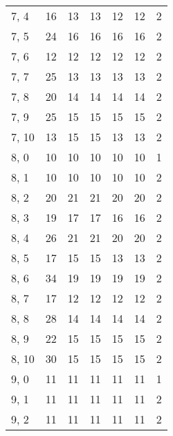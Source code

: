 \begin{table}
\begin{tabular}{lrrrrrr}
7, 4   &          16 &           13 &         13 &           12 &        12 &      2 \\
7, 5   &          24 &           16 &         16 &           16 &        16 &      2 \\
7, 6   &          12 &           12 &         12 &           12 &        12 &      2 \\
7, 7   &          25 &           13 &         13 &           13 &        13 &      2 \\
7, 8   &          20 &           14 &         14 &           14 &        14 &      2 \\
7, 9   &          25 &           15 &         15 &           15 &        15 &      2 \\
7, 10  &          13 &           15 &         15 &           13 &        13 &      2 \\
8, 0   &          10 &           10 &         10 &           10 &        10 &      1 \\
8, 1   &          10 &           10 &         10 &           10 &        10 &      2 \\
8, 2   &          20 &           21 &         21 &           20 &        20 &      2 \\
8, 3   &          19 &           17 &         17 &           16 &        16 &      2 \\
8, 4   &          26 &           21 &         21 &           20 &        20 &      2 \\
8, 5   &          17 &           15 &         15 &           13 &        13 &      2 \\
8, 6   &          34 &           19 &         19 &           19 &        19 &      2 \\
8, 7   &          17 &           12 &         12 &           12 &        12 &      2 \\
8, 8   &          28 &           14 &         14 &           14 &        14 &      2 \\
8, 9   &          22 &           15 &         15 &           15 &        15 &      2 \\
8, 10  &          30 &           15 &         15 &           15 &        15 &      2 \\
9, 0   &          11 &           11 &         11 &           11 &        11 &      1 \\
9, 1   &          11 &           11 &         11 &           11 &        11 &      2 \\
9, 2   &          11 &           11 &         11 &           11 &        11 &      2 \\

\end{tabular}
\end{table}
